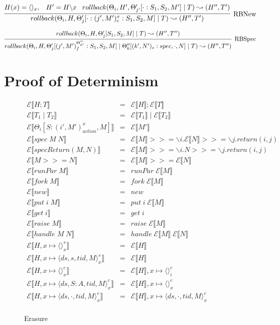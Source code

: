 \documentclass[9pt]{article}
\newcommand{\erase}[1]{\mathcal{E}\llbracket #1 \rrbracket}
\begin{document}
\[%
\infer[\text{RBNew}]{rollback(\Theta_i, H, \Theta_j'[\cdot : (j', M')_c^x : S_1, S_2, M] \; | \; T) \leadsto (H'', T')}{H(x) = \langle\rangle_x, \;\;\; H' = H \backslash x \;\;\; rollback(\Theta_i, H', \Theta_{j'}'[\cdot : S_1, S_2, M'] \; | \; T) \leadsto (H'', T')}
\]

\[%
\infer[\text{RBSpec}]{rollback(\Theta_i, H, \Theta_j'[(j', M')_f^{\Theta_{k'}''} : S_1, S_2, M] \; | \; \Theta_k''[(k', N')_s : spec, \cdot, N] \; | \; T) \leadsto (H'', T'')}{rollback(\Theta_i, H, \Theta_j'[S_1, S_2, M] \; | \; T) \leadsto (H'', T'')}
\]

\section{Proof of Determinism}



\begin{figure}[H]
\centering

\begin{displaymath}
\begin{array}{rcll}
\erase{H; T} &=& \erase{H}; \erase{T} \\
\erase{T_1 \; | \; T_2} &=& \erase{T_1} \; | \; \erase{T_2} \\
\erase{\Theta_i[S : (i', M')_{action}^x, M]} &=& \erase{M'} \\
\erase{ spec \; M \; N} &=& \erase{M} >>= \backslash i . \erase{N} >>= \backslash j. return(i, j) \\
\erase{specReturn(M, N)} &=& \erase{M} >>= \backslash i. N >>= \backslash j. return(i, j) \\
\erase{M >>= N} &=& \erase{M} >>= \erase{N}\\
\erase{runPar \; M} &=& runPar \; \erase{M} \\
\erase{fork \; M} &=& fork \; \erase{M} \\
\erase{new} &=& new \\
\erase{put \; i \; M} &=& put \; i \; \erase{M} \\
\erase{get \; i} &=& get \; i \\
\erase{raise \; M} &=& raise \; \erase{M} \\
\erase{handle \; M \; N} &=& handle \; \erase{M} \; \erase{N}  \\
\erase{H, x \mapsto \langle\rangle_x^s} &=& \erase{H} \\
\erase{H, x \mapsto \langle ds, s, tid, M\rangle_x^s} &=& \erase{H} \\
\erase{H, x \mapsto \langle\rangle_x^c} &=& \erase{H}, x\mapsto \langle\rangle_i^c \\
\erase{H, x\mapsto \langle ds, S : A, tid, M\rangle_x^c} &=& \erase{H}, x \mapsto \langle\rangle_x^c \\
\erase{H, x \mapsto \langle ds, \cdot, tid, M\rangle_x^c} &=& \erase{H}, x \mapsto \langle ds, \cdot, tid, M\rangle_x^c \\
\end{array}
\end{displaymath}
\caption{Erasure}
\end{figure}
\end{document}
